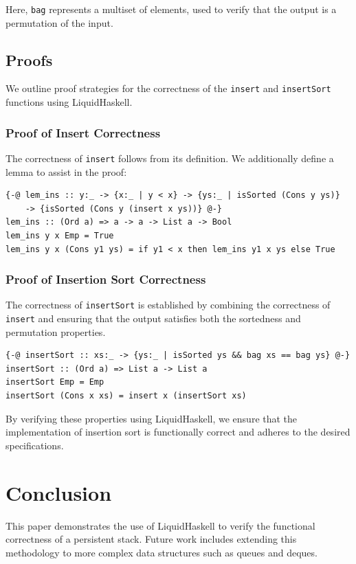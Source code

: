 \documentclass[]{rptuseminar}
\begin{document}
Here, \texttt{bag} represents a multiset of elements, used to verify that the output is a permutation of the input.

\subsection{Proofs}

We outline proof strategies for the correctness of the \texttt{insert} and \texttt{insertSort} functions using LiquidHaskell.

\subsubsection{Proof of Insert Correctness}

The correctness of \texttt{insert} follows from its definition. We additionally define a lemma to assist in the proof:

\begin{lstlisting}[caption=Insert Lemma]
{-@ lem_ins :: y:_ -> {x:_ | y < x} -> {ys:_ | isSorted (Cons y ys)} 
    -> {isSorted (Cons y (insert x ys))} @-}
lem_ins :: (Ord a) => a -> a -> List a -> Bool
lem_ins y x Emp = True
lem_ins y x (Cons y1 ys) = if y1 < x then lem_ins y1 x ys else True
\end{lstlisting}

\subsubsection{Proof of Insertion Sort Correctness}

The correctness of \texttt{insertSort} is established by combining the correctness of \texttt{insert} and ensuring that the output satisfies both the sortedness and permutation properties.

\begin{lstlisting}[caption=Insertion Sort Proof]
{-@ insertSort :: xs:_ -> {ys:_ | isSorted ys && bag xs == bag ys} @-}
insertSort :: (Ord a) => List a -> List a
insertSort Emp = Emp
insertSort (Cons x xs) = insert x (insertSort xs)
\end{lstlisting}

By verifying these properties using LiquidHaskell, we ensure that the implementation of insertion sort is functionally correct and adheres to the desired specifications.

\section{Conclusion}
This paper demonstrates the use of LiquidHaskell to verify the functional correctness of a persistent stack. Future work includes extending this methodology to more complex data structures such as queues and deques.
\label{sec:example}
\end{document}
